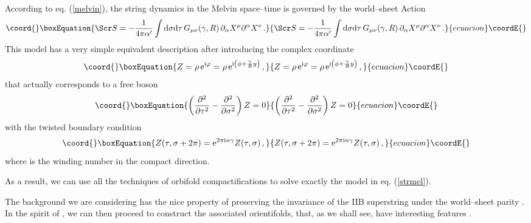 \documentclass[a4paper,12pt]{article}
\begin{document}
According to eq. (\ref{melvin}), the string dynamics in the Melvin 
space--time is governed by the world--sheet Action
\begin{equation}\coord{}\boxEquation{
{\Scr S} = - {1\over 4\pi \alpha '} \int {\rm d} \sigma {\rm d} \tau
\, G_{\mu \nu} (\gamma , R) \, \partial_\alpha X^\mu \partial^\alpha X^\nu
\,. \label{strmel}
}{
{\Scr S} = - {1\over 4\pi \alpha '} \int {\rm d} \sigma {\rm d} \tau
\, G_{\mu \nu} (\gamma , R) \, \partial_\alpha X^\mu \partial^\alpha X^\nu
\,. }{ecuacion}\coordE{}\end{equation}
This model has a very simple equivalent description after introducing
the complex coordinate
\begin{equation}\coord{}\boxEquation{ 
Z = \rho \, {\rm e}^{{\rm i} \varphi} =
\rho \, {\rm e}^{{\rm i} \left( \phi + {\gamma \over R} y\right)} \,,
}{ 
Z = \rho \, {\rm e}^{{\rm i} \varphi} =
\rho \, {\rm e}^{{\rm i} \left( \phi + {\gamma \over R} y\right)} \,,
}{ecuacion}\coordE{}\end{equation}
that actually corresponds to a free boson
\begin{equation}\coord{}\boxEquation{
\left( {\partial^2 \over \partial \tau^2} - {\partial^2 \over \partial
\sigma^2}\right) Z = 0 
}{
\left( {\partial^2 \over \partial \tau^2} - {\partial^2 \over \partial
\sigma^2}\right) Z = 0 
}{ecuacion}\coordE{}\end{equation}
with the twisted boundary condition
\begin{equation}\coord{}\boxEquation{
Z ( \tau , \sigma + 2 \pi ) = {\rm e}^{2\pi {\rm i} n \gamma} Z (\tau ,
\sigma ) \,,
\label{twist}
}{
Z ( \tau , \sigma + 2 \pi ) = {\rm e}^{2\pi {\rm i} n \gamma} Z (\tau ,
\sigma ) \,,
}{ecuacion}\coordE{}\end{equation}
where \coordHE{} is the winding number in the compact \coordHE{} direction.

As a result, we can use all the techniques of orbifold compactifications
to solve exactly the model in eq. (\ref{strmel}).

The background we are considering has the nice property of preserving 
the invariance of the IIB superstring under the world--sheet parity
\myHighlight{$\Omega$}\coordHE{}. In the spirit of \cite{cargese}, we can then proceed to 
construct the associated orientifolds, that, as we shall see, have 
interesting features \cite{adm}.
\end{document}
